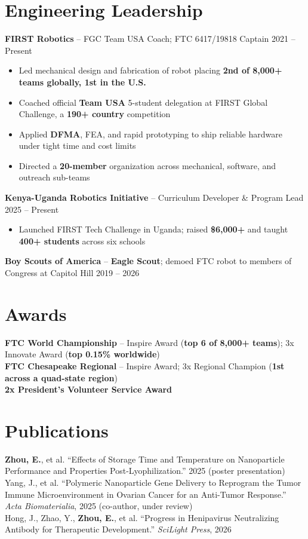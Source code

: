 \documentclass[10pt, letterpaper]{article}
\begin{document}
\section{Engineering Leadership}
    \textbf{FIRST Robotics} -- FGC Team USA Coach; FTC 6417/19818 Captain
    \hfill 2021 -- Present
    \begin{itemize}
        \item Led mechanical design and fabrication of robot placing \textbf{2nd of 8,000+ teams globally, 1st in the U.S.}
        \item Coached official \textbf{Team USA} 5-student delegation at FIRST Global Challenge, a \textbf{190+ country} competition
        \item Applied \textbf{DFMA}, FEA, and rapid prototyping to ship reliable hardware under tight time and cost limits
        \item Directed a \textbf{20-member} organization across mechanical, software, and outreach sub-teams
    \end{itemize}
    \textbf{Kenya-Uganda Robotics Initiative} -- Curriculum Developer \& Program Lead
    \hfill 2025 -- Present
    \begin{itemize}
        \item Launched FIRST Tech Challenge in Uganda; raised \textbf{\$6,000+} and taught \textbf{400+ students} across six schools
    \end{itemize}
    \textbf{Boy Scouts of America} -- \textbf{Eagle Scout}; demoed FTC robot to members of Congress at Capitol Hill
    \hfill 2019 -- 2026

\section{Awards}
    \textbf{FTC World Championship} -- Inspire Award (\textbf{top 6 of 8,000+ teams}); 3x Innovate Award (\textbf{top 0.15\% worldwide}) \\
    \textbf{FTC Chesapeake Regional} -- Inspire Award; 3x Regional Champion (\textbf{1st across a quad-state region}) \\
    \textbf{2x President's Volunteer Service Award}

\section{Publications}
    \textbf{Zhou, E.}, et al. ``Effects of Storage Time and Temperature on Nanoparticle Performance and Properties Post-Lyophilization.'' 2025 (poster presentation) \\
    Yang, J., et al. ``Polymeric Nanoparticle Gene Delivery to Reprogram the Tumor Immune Microenvironment in Ovarian Cancer for an Anti-Tumor Response.'' \textit{Acta Biomaterialia}, 2025 (co-author, under review) \\
    Hong, J., Zhao, Y., \textbf{Zhou, E.}, et al. ``Progress in Henipavirus Neutralizing Antibody for Therapeutic Development.'' \textit{SciLight Press}, 2026
\end{document}
